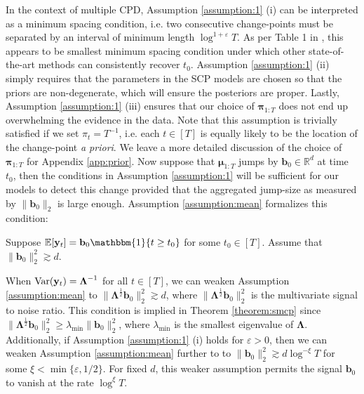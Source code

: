 In the context of multiple CPD, Assumption \ref{assumption:1} (i) can be interpreted as a minimum spacing condition, i.e. two consecutive change-points must be separated by an interval of minimum length $\log^{1+\varepsilon} T$. As per Table 1 in \cite{Cho15}, this appears to be smallest minimum spacing condition under which other state-of-the-art methods can consistently recover $t_0$. Assumption \ref{assumption:1} (ii) simply requires that the parameters in the SCP models are chosen so that the priors are non-degenerate, which will ensure the posteriors are proper. Lastly, Assumption \ref{assumption:1} (iii) ensures that our choice of $\boldsymbol{\pi}_{1:T}$ does not end up overwhelming the evidence in the data. Note that this assumption is trivially satisfied if we set $\pi_t = T^{-1}$, i.e. each $t \in [T]$ is equally likely to be the location of the change-point \textit{a priori}. We leave a more detailed discussion of the choice of $\boldsymbol{\pi}_{1:T}$ for Appendix \ref{app:prior}. Now suppose that $\boldsymbol{\mu}_{1:T}$ jumps by $\mathbf{b}_0\in\mathbb{R}^d$ at time $t_0$, then the conditions in Assumption \ref{assumption:1} will be sufficient for our models to detect this change provided that the aggregated jump-size as measured by $\lVert \mathbf{b}_0 \rVert_2$ is large enough. Assumption \ref{assumption:mean} formalizes this condition:

\begin{assumption}\label{assumption:mean}  
    Suppose $\E[\mathbf{y}_t] = \mathbf{b}_0\mathbbm{1}\{t \geq t_0\}$ for some $t_0 \in [T]$. Assume that $\lVert \mathbf{b}_0 \rVert^2_2 \gtrsim d$.
\end{assumption}
\vspace{-10pt}

\begin{remark}\label{rmk:vanishing-signal}
    When $\normalfont{\text{Var}}(\mathbf{y}_t) = \boldsymbol{\Lambda}^{-1}$ for all $t \in [T]$, we can weaken Assumption \ref{assumption:mean} to $\lVert \boldsymbol{\Lambda}^{\frac{1}{2}} \mathbf{b}_0\rVert_2^2 \gtrsim d$, where $\lVert \boldsymbol{\Lambda}^{\frac{1}{2}} \mathbf{b}_0\rVert_2^2$ is the multivariate signal to noise ratio. This condition is implied in Theorem \ref{theorem:smcp} since $\lVert \boldsymbol{\Lambda}^{\frac{1}{2}} \mathbf{b}_0\rVert_2^2 \geq \lambda_{\min} \lVert \mathbf{b}_0\rVert_2^2$, where $\lambda_{\min}$ is the smallest eigenvalue of $\boldsymbol{\Lambda}$. Additionally, if Assumption \ref{assumption:1} (i) holds for $\varepsilon > 0$, then we can weaken Assumption \ref{assumption:mean} further to to $\lVert \mathbf{b}_0 \rVert^2_2 \gtrsim d\log^{-\xi} T$ for some $\xi < \min\{\varepsilon, 1/2\}$. For fixed $d$, this weaker assumption permits the signal $\mathbf{b}_0$ to vanish at the rate $\log^{\xi} T$.
\end{remark}
\vspace{-10pt}

